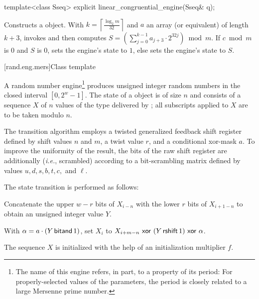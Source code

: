 \begin{itemdecl}
template<class Sseq> explicit linear_congruential_engine(Sseq& q);
\end{itemdecl}

\begin{itemdescr}
\pnum\effects Constructs a  object.
 With
 $ k = \left\lceil \frac{\log_2 m}
                        {32}
            \right\rceil
 $
 and $a$ an array (or equivalent)
 of length $k + 3$,
 invokes 
 and then computes
 $ S = \left(\sum_{j=0}^{k-1}a_{j+3} \cdot 2^{32j} \right) \bmod m $.
 If
   $ c \bmod m $ is $0$
 and
   $S$ is $0$,
 sets the engine's state to $1$,
 else sets the engine's state
 to $S$.
\end{itemdescr}


[rand.eng.mers]{Class template }%
%

\pnum
A  random number
engine\footnote{The name of this engine refers, in part, to a property of its period:
 For properly-selected values of the parameters,
 the period is closely related to a large Mersenne prime number.}
produces unsigned integer random numbers
in the closed interval $[0,2^w-1]$.
The
%
%
state
of a  object 
is of size $n$
and consists of a sequence $X$
of $n$ values of the type delivered by ;
all subscripts applied to $X$ are to be taken modulo $n$.

\pnum
The transition algorithm%
%
employs a twisted generalized feedback shift register
defined by shift values $n$ and $m$, a twist value $r$,
and a conditional xor-mask $a$.
To improve the uniformity of the result,
the bits of the raw shift register are additionally 
(\textit{i.e.}, scrambled)
according to a bit-scrambling matrix
defined by values $u, d, s, b, t, c,$ and $\ell$.

The state transition is performed as follows:
\begin{enumeratea}
 \item
   Concatenate
     the upper $w-r$ bits of $X_{i-n}$
   with
     the lower $r$ bits of $X_{i+1-n}$
   to obtain an unsigned integer value $Y$.
 \item
   With $\alpha = a \cdot (Y \, \mathsf{bitand} \, 1)$,
   set $X_i$ to
     $X_{i+m-n} \, \, \mathsf{xor} \, \, (Y \, \mathsf{rshift} \, 1) \, \, \mathsf{xor} \, \, \alpha$.
\end{enumeratea}
The sequence $X$ is initialized
with the help of an initialization multiplier $f$.

